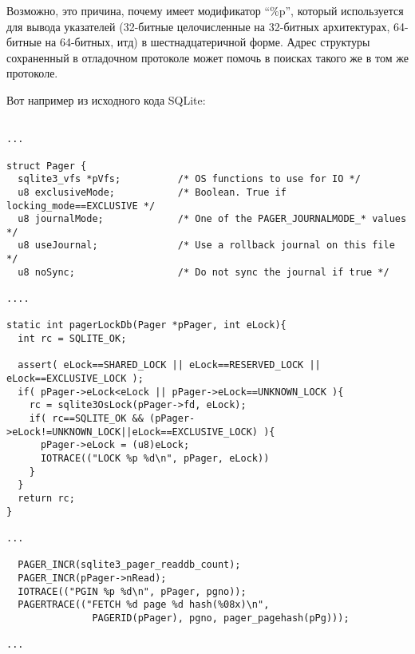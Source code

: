 Возможно, это причина, почему \printf имеет модификатор ``\%p'', который используется для вывода указателей (32-битные
целочисленные на 32-битных архитектурах, 64-битные на 64-битных, итд) в шестнадцатеричной форме.
Адрес структуры сохраненный в отладочном протоколе может помочь в поисках такого же в том же протоколе.

Вот например из исходного кода SQLite:

\begin{lstlisting}

...

struct Pager {
  sqlite3_vfs *pVfs;          /* OS functions to use for IO */
  u8 exclusiveMode;           /* Boolean. True if locking_mode==EXCLUSIVE */
  u8 journalMode;             /* One of the PAGER_JOURNALMODE_* values */
  u8 useJournal;              /* Use a rollback journal on this file */
  u8 noSync;                  /* Do not sync the journal if true */

....

static int pagerLockDb(Pager *pPager, int eLock){
  int rc = SQLITE_OK;

  assert( eLock==SHARED_LOCK || eLock==RESERVED_LOCK || eLock==EXCLUSIVE_LOCK );
  if( pPager->eLock<eLock || pPager->eLock==UNKNOWN_LOCK ){
    rc = sqlite3OsLock(pPager->fd, eLock);
    if( rc==SQLITE_OK && (pPager->eLock!=UNKNOWN_LOCK||eLock==EXCLUSIVE_LOCK) ){
      pPager->eLock = (u8)eLock;
      IOTRACE(("LOCK %p %d\n", pPager, eLock))
    }
  }
  return rc;
}

...

  PAGER_INCR(sqlite3_pager_readdb_count);
  PAGER_INCR(pPager->nRead);
  IOTRACE(("PGIN %p %d\n", pPager, pgno));
  PAGERTRACE(("FETCH %d page %d hash(%08x)\n",
               PAGERID(pPager), pgno, pager_pagehash(pPg)));

...

\end{lstlisting}

